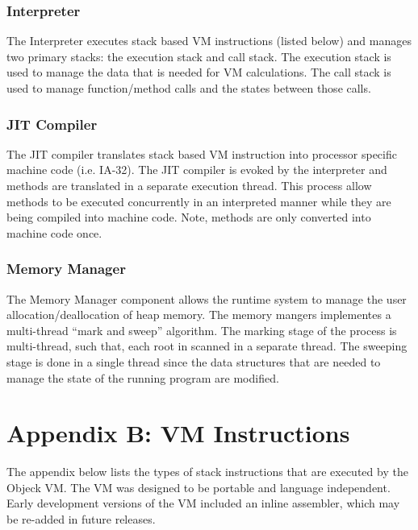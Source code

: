 \documentclass[12pt]{article}
\begin{document}
\subsubsection{Interpreter}
The Interpreter executes stack based VM instructions (listed below) and manages two primary stacks: the execution stack and call stack.  The execution stack is used to manage the data that is needed for VM calculations.  The call stack is used to manage function/method calls and the states between those calls.

\subsubsection{JIT Compiler}
The JIT compiler translates stack based VM instruction into processor specific machine code (i.e. IA-32).  The JIT compiler is evoked by the interpreter and methods are translated in a separate execution thread.  This process allow methods to be executed concurrently in an interpreted manner while they are being compiled into machine code.  Note, methods are only converted into machine code once.

\subsubsection{Memory Manager}
The Memory Manager component allows the runtime system to manage the user allocation/deallocation of heap memory.  The memory mangers implementes a multi-thread ``mark and sweep'' algorithm.  The marking stage of the process is multi-thread, such that, each root in scanned in a separate thread.  The sweeping stage is done in a single thread since the data structures that are needed to manage the state of the running program are modified.

\section{Appendix B: VM Instructions}
The appendix below lists the types of stack instructions that are executed by the Objeck VM.  The VM was designed to be portable and language independent.  Early development versions of the VM included an inline assembler, which may be re-added in future releases.
\end{document}
